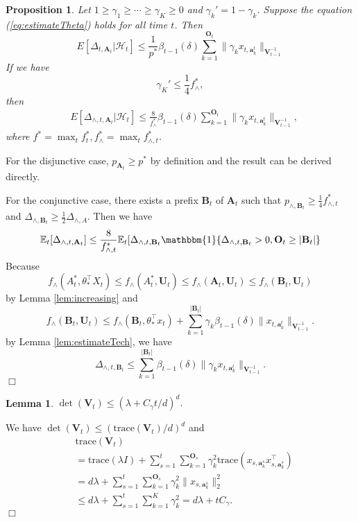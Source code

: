 \documentclass{article}
\newcommand{\EE}{\mathbb{E}}
\newcommand{\bOne}{\mathbbm{1}}
\newcommand{\bA}{\mathbf{A}}
\newcommand{\ba}{\mathbf{a}}
\newcommand{\bB}{\mathbf{B}}
\newcommand{\bO}{\mathbf{O}}
\newcommand{\bU}{\mathbf{U}}
\newcommand{\bV}{\mathbf{V}}
\newcommand{\cH}{\mathcal{H}}
\newcommand{\trace}{\mathrm{trace}}
\newcommand{\abs}[1]{\left| #1 \right|}
\newcommand{\norm}[1]{\| #1 \|}
\newtheorem{proposition}[theorem]{Proposition}%
\newtheorem{lemma}[theorem]{Lemma}%
\newenvironment{proof}{\noindent {\textbf{Proof. }}}{$\Box$ \medskip}
\begin{document}
\begin{proposition}
Let $1 \geq \gamma_1 \geq \cdots \geq \gamma_K \geq 0$ and $\gamma_k' = 1 - \gamma_k$. Suppose the equation (\ref{eq:estimateTheta}) holds for all time $t$. Then
$$
E[\Delta_{t, \bA_t}|\cH_t] \leq \frac{1}{p^*} \beta_{t-1}(\delta)\sum_{k=1}^{\bO_t}\norm{\gamma_k x_{t,\ba_k^t}}_{\bV_{t-1}^{-1}}
$$
If we have
$$
\gamma_K' \le \frac{1}{4} f_{\wedge}^{\ast},
$$
then
\begin{align*}
&E[\Delta_{\wedge, t, \bA_t}|\cH_t] \leq \frac{8}{f_{\wedge}^{\ast}} \beta_{t-1}(\delta)\sum_{k=1}^{\bO_t}\norm{\gamma_k x_{t,\ba_k^t}}_{\bV_{t-1}^{-1}},
\end{align*}
where $f^{\ast} = \max_{t} f_t^{\ast}, f_{\wedge}^{\ast} = \max_{t} f_{\wedge, t}^{\ast}$.
\end{proposition}
\begin{proof}
For the disjunctive case,  $p_{\bA_t} \geq p^*$ by definition and the result can be derived directly.

For the conjunctive case, there exists a prefix $\bB_t$ of $\bA_t$ such that $p_{\wedge, \bB_t} \geq \frac{1}{4}f_{\wedge, t}^*$ and $\Delta_{\wedge, \bB_t} \geq \frac{1}{2}\Delta_{\wedge, A}$. Then we have
$$
\EE_t[\Delta_{\wedge, t, \bA_t}] \leq \frac{8}{f_{\wedge, t}^*} \EE_t[\Delta_{\wedge, t, \bB_t} \bOne\{\Delta_{\wedge, t, \bB_t} > 0, \bO_t \geq \abs{\bB_t}\}
$$
Because 
$$
f_{\wedge}(A_t^*, \theta_*^{\top}X_t) \leq f_{\wedge}(A_t^*,\bU_t) \leq f_{\wedge}(\bA_t,\bU_t) \leq f_{\wedge}(\bB_t,\bU_t)
$$
by Lemma \ref{lem:increasing} and
$$
f_{\wedge}(\bB_t,\bU_t) \leq f_{\wedge}(\bB_t, \theta_*^{\top}x_t) + \sum_{k=1}^{\abs{\bB_t}}\gamma_k\beta_{t-1}(\delta)\norm{x_{t,\ba_k^t}}_{\bV_{t-1}^{-1}}.
$$
by Lemma \ref{lem:estimateTech}, we have
$$
\Delta_{\wedge, t, \bB_t} \leq \sum_{k=1}^{\abs{\bB_t}}\beta_{t-1}(\delta)\norm{\gamma_k x_{t,\ba_k^t}}_{\bV_{t-1}^{-1}}.
$$
\end{proof}
	
\begin{lemma} %
$\det(\bV_t) \leq (\lambda + C_\gamma t/d)^d.$
\end{lemma}
\begin{proof}
We have $\det(\bV_t) \leq (\trace(\bV_t)/d)^d$ and
\begin{align*}
&\trace(\bV_t)\\
& = \trace(\lambda I) + \sum_{s=1}^t \sum_{k=1}^{\bO_s} \gamma_k^2 \trace(x_{s,\ba_k^s} x_{s,\ba_k^s}^{\top})\\	
& = d \lambda + \sum_{s=1}^t \sum_{k=1}^{\bO_s} \gamma_k^2 \norm{x_{s,\ba_k^s}}_2^2\\
& \leq d \lambda + \sum_{s=1}^t\sum_{k=1}^{K}\gamma_k^2 = d \lambda + t C_\gamma.
\end{align*}
\end{proof}
\end{document}
